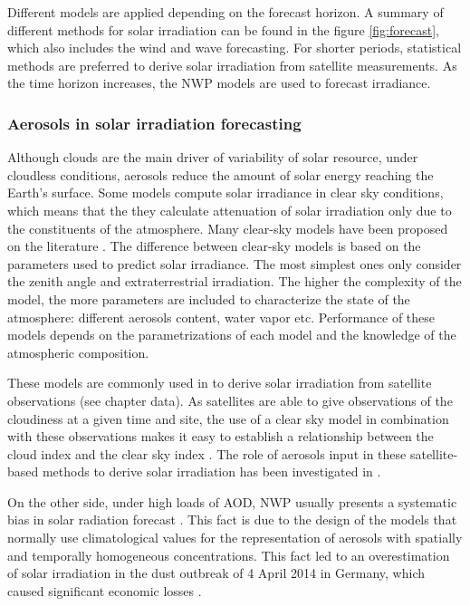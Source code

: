 \begin{itemize}
Different models are applied depending on the forecast horizon. A summary of different methods for solar irradiation can be found in the figure \ref{fig:forecast}, which also includes the wind and wave forecasting. For shorter periods, statistical methods are preferred to derive solar irradiation from satellite measurements. As the time horizon increases, the NWP models are used to forecast irradiance.


\end{itemize}

\subsubsection{Aerosols in solar irradiation forecasting}

Although clouds are the main driver of variability of solar resource, under cloudless conditions, aerosols reduce the amount of solar energy reaching the Earth's surface. Some models compute solar irradiance in clear sky conditions, which means that the they calculate attenuation of solar irradiation only due to the constituents of the atmosphere. Many clear-sky models have been proposed on the literature \cite*{Gueymard2012}. The difference between clear-sky models is based on the parameters used to predict solar irradiance. The most simplest ones only consider the zenith angle and extraterrestrial irradiation. The higher the complexity of the model, the more parameters are included to characterize the state of the atmosphere: different aerosols content, water vapor etc. Performance of these models depends on the parametrizations of each model and the knowledge of the atmospheric composition.
 
These models are commonly used in to derive solar irradiation from satellite observations (see chapter data). As satellites are able to give observations of the cloudiness at a given time and site, the use of a clear sky model in combination with these observations makes it easy to establish a relationship between the cloud index and the clear sky index . The role of aerosols input in these satellite-based methods to derive solar irradiation has been investigated in \cite*{Polo2014}. 

On the other side, under high loads of AOD, NWP usually presents a systematic bias in solar radiation forecast \cite*{Rieger2017}. This fact is due to the design of the models that normally use climatological values for the representation of aerosols with spatially and temporally homogeneous concentrations. This fact led to an overestimation of solar irradiation in the dust outbreak of 4 April 2014 in Germany, which caused significant economic losses \cite{Rieger2017}.

